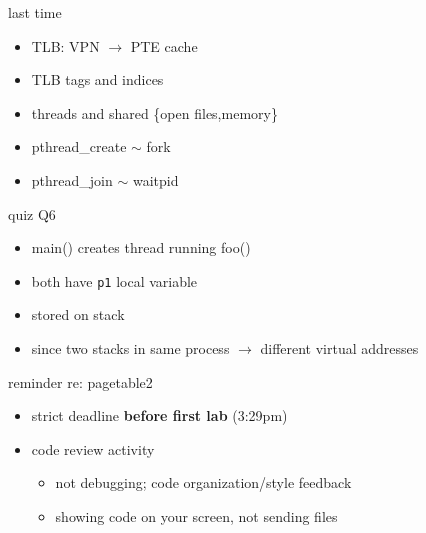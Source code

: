 \date{}
\title{}
\date{}

\begin{frame}
    \titlepage
\end{frame}



\begin{frame}{last time}
    \begin{itemize}
    \item TLB: VPN $\rightarrow$ PTE cache
    \item TLB tags and indices
    \vspace{.5cm}
    \item threads and shared \{open files,memory\}
    \item pthread\_create $\sim$ fork
    \item pthread\_join $\sim$ waitpid
    \end{itemize}
\end{frame}

\begin{frame}{quiz Q6}
    \begin{itemize}
    \item main() creates thread running foo()
    \item both have \texttt{p1} local variable
    \item stored on stack
    \item since two stacks in same process $\rightarrow$ different virtual addresses
    \end{itemize}
\end{frame}

\begin{frame}{reminder re: pagetable2}
    \begin{itemize}
    \item strict deadline \textbf{before first lab} (3:29pm)
    \item code review activity
        \begin{itemize}
        \item not debugging; code organization/style feedback
        \item showing code on your screen, not sending files
        \end{itemize}
    \end{itemize}
\end{frame}






